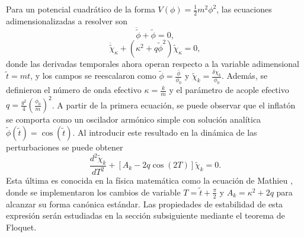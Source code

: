 Para un potencial cuadrático de la forma $\displaystyle V(\phi) = \frac{1}{2} m^2 \phi^2$, las ecuaciones adimensionalizadas a resolver son
\begin{equation}
    \ddot{\tilde{\phi}} + \tilde{\phi} = 0,
\end{equation}
\begin{equation}
    \ddot{\tilde{\chi}}_{\kappa} + \left( \kappa^2 + q \tilde{\phi}^2 \right) \tilde{\chi}_\kappa = 0,
\end{equation}
donde las derivadas temporales ahora operan respecto a la variable adimensional $\tilde{t} = m t$, y los campos se reescalaron como $\displaystyle \tilde{\phi} = \frac{\bar{\phi}}{\phi_0}$ y $\displaystyle \tilde{\chi}_k = \frac{\delta \chi_k}{\phi_0}$. Además, se definieron el número de onda efectivo $\displaystyle \kappa = \frac{k}{m}$ y el parámetro de acople efectivo $\displaystyle q = \frac{g^2}{4} \left( \frac{\phi_0}{m} \right)^2$. A partir de la primera ecuación, se puede observar que el inflatón se comporta como un oscilador armónico simple con solución analítica $\tilde{\phi} \left( \tilde{t} \right) = \cos \left( \tilde{t} \right)$. Al introducir este resultado en la dinámica de las perturbaciones se puede obtener
\begin{equation}
    \frac{d^2 \tilde{\chi}_k}{dT^2} + \left[ A_k - 2 q \cos (2T) \right] \tilde{\chi}_k = 0.
\end{equation}
Esta última es conocida en la física matemática como la ecuación de Mathieu \cite{McLachlan_1947}, donde se implementaron los cambios de variable $\displaystyle T = \tilde{t} + \frac{\pi}{2}$ y $A_k = \kappa^2 + 2q$ para alcanzar su forma canónica estándar. Las propiedades de estabilidad de esta expresión serán estudiadas en la sección subsiguiente mediante el teorema de Floquet.

